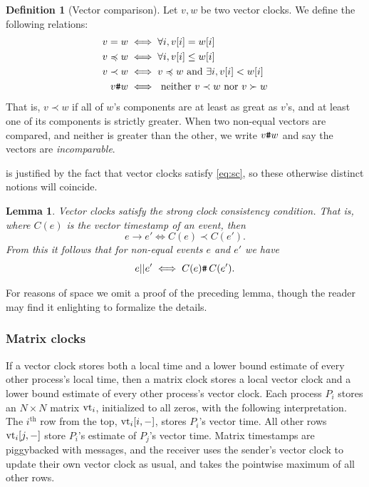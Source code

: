 \documentclass[]             %
{NASA}                       %
\newtheorem{lemma}[theorem]{Lemma}
\theoremstyle{definition}
\newtheorem{definition}[theorem]{Definition}
\begin{document}
\begin{definition}[Vector comparison]
  Let $v, w$ be two vector clocks. We define the following relations:
  \begin{align*}
             v = w &\iff \forall i, v[i] = w[i] \\
  v \preccurlyeq w &\iff \forall i, v[i] \leq w[i] \\
         v \prec w &\iff v \preccurlyeq w \textrm{ and } \exists i, v[i] < w[i] \\
            v {\textrm{\texttt{\#}}} w &\iff \textrm{ neither } v \prec w \textrm{ nor } v \succ w
  \end{align*}
  That is, $v \prec w$ if all of $w$'s components are at least as
  great as $v$'s, and at least one of its components is strictly
  greater. When two non-equal vectors are compared, and neither is
  greater than the other, we write $v {\textrm{\texttt{\#}}} w$ and say the vectors
  are \emph{incomparable}.
\end{definition}

 is justified by the fact that vector
clocks satisfy \ref{eq:sc}, so these otherwise distinct notions will
coincide.

\begin{lemma}
  Vector clocks satisfy the strong clock consistency condition. That
  is, where $C(e)$ is the vector timestamp of an event, then
  \[ e \to e' \iff C(e) \prec C(e'). \]
  From this it follows that for non-equal events $e$ and $e'$ we have
  \[e || e' \iff {C(e) \texttt{\#}\,C(e')}. \]%
\end{lemma}

For reasons of space we omit a proof of the preceding lemma, though
the reader may find it enlighting to formalize the details.

\subsubsection{Matrix clocks}
\label{sssec:matrix-clocks}
If a vector clock stores both a local time and a lower bound estimate
of every other process's local time, then a matrix clock stores a
local vector clock and a lower bound estimate of every other process's
vector clock. Each process $P_i$ stores an $N\times{}N$ matrix
$\textrm{vt}_i$, initialized to all zeros, with the following
interpretation. The $i^{\textrm{th}}$ row from the top, $\textrm{vt}_i[i, -]$,
stores $P_i$'s vector time. All other rows $\textrm{vt}_i[j,-]$ store $P_i$'s
estimate of $P_j$'s vector time. Matrix timestamps are piggybacked
with messages, and the receiver uses the sender's vector clock to
update their own vector clock as usual, and takes the pointwise
maximum of all other rows.
\end{document}
